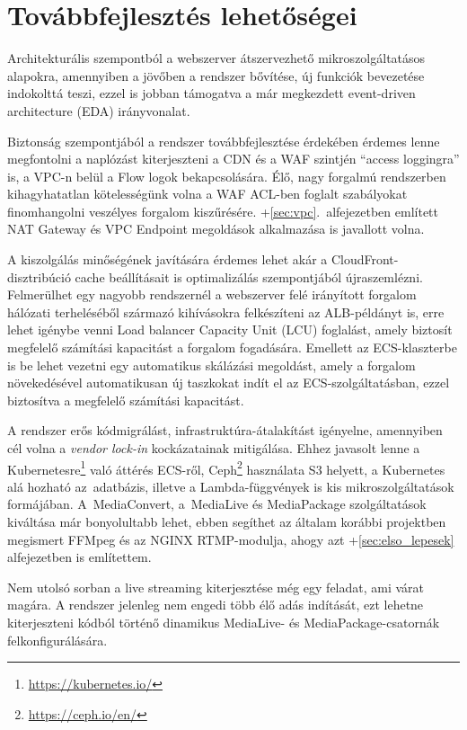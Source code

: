 \section{Továbbfejlesztés lehetőségei}

Architekturális szempontból a webszerver átszervezhető mikroszolgáltatásos alapokra, amennyiben a jövőben a rendszer bővítése, új funkciók bevezetése indokolttá teszi, ezzel is jobban támogatva a már megkezdett event-driven architecture (EDA)\cite{eda} irányvonalat.

Biztonság szempontjából a rendszer továbbfejlesztése érdekében érdemes lenne megfontolni a naplózást kiterjeszteni a CDN és a WAF szintjén ``access loggingra'' is, a VPC-n belül a Flow logok bekapcsolására. Élő, nagy forgalmú rendszerben kihagyhatatlan kötelességünk volna a WAF ACL-ben foglalt szabályokat finomhangolni veszélyes forgalom kiszűrésére. \Az+\ref{sec:vpc}.~alfejezetben említett NAT Gateway és VPC Endpoint megoldások alkalmazása is javallott volna.

A kiszolgálás minőségének javítására érdemes lehet akár a CloudFront-disztribúció cache beállításait is optimalizálás szempontjából újraszemlézni. Felmerülhet egy nagyobb rendszernél a webszerver felé irányított forgalom hálózati terheléséből származó kihívásokra felkészíteni az ALB-példányt is, erre lehet igénybe venni Load balancer Capacity Unit (LCU) foglalást, amely biztosít megfelelő számítási kapacitást a forgalom fogadására. Emellett az ECS-klaszterbe is be lehet vezetni egy automatikus skálázási megoldást, amely a forgalom növekedésével automatikusan új taszkokat indít el az ECS-szolgáltatásban, ezzel biztosítva a megfelelő számítási kapacitást.

A rendszer erős kódmigrálást, infrastruktúra-átalakítást igényelne, amennyiben cél volna a \emph{vendor lock-in}\cite{lockIn} kockázatainak mitigálása. Ehhez javasolt lenne a Kubernetesre\footnote{\url{https://kubernetes.io/}} való áttérés ECS-ről\cite{k8s}, Ceph\footnote{\url{https://ceph.io/en/}} használata S3 helyett, a Kubernetes alá hozható az~adatbázis, illetve a Lambda-függvények is kis mikroszolgáltatások formájában. A~MediaConvert, a~MediaLive és MediaPackage szolgáltatások kiváltása már bonyolultabb lehet, ebben segíthet az általam korábbi projektben megismert FFMpeg és az NGINX RTMP\leavevmode\hbox{-}modulja\cite{rtmpNginx}, ahogy azt \az+\ref{sec:elso_lepesek} alfejezetben is említettem.

Nem utolsó sorban a live streaming kiterjesztése még egy feladat, ami várat magára. A rendszer jelenleg nem engedi több élő adás indítását, ezt lehetne kiterjeszteni kódból történő dinamikus MediaLive- és MediaPackage-csatornák felkonfigurálására.
